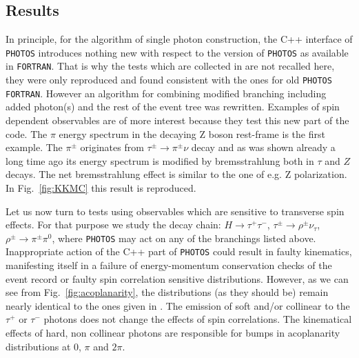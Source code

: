 \documentclass[]{Photos_interface_design}
\begin{document}
\subsection{Results}
\label{sec:results}
In principle, for the algorithm of single photon construction, the C++ interface of
{\tt PHOTOS} introduces nothing new with respect to the 
version of {\tt PHOTOS} as available in {\tt FORTRAN}.
That is why the  tests which are collected in \cite{Photos_tests} are not
recalled here, they were only reproduced and found consistent with the ones for
old {\tt PHOTOS FORTRAN}.
However an algorithm for combining modified branching including added 
photon(s) and the rest of the event tree was rewritten.
Examples of spin dependent observables are of more interest because they test this new part of the code.
The $\pi$ energy spectrum in the decaying
Z boson rest-frame is the first example. 
The $\pi^\pm$ originates from $\tau^\pm \to \pi^\pm \nu $ decay and 
as was shown already a long time ago \cite{Boillot:1988re} its energy spectrum is modified by bremsstrahlung both in $\tau$ and $Z$ decays. The net
bremsstrahlung  effect is similar to the one of e.g. Z polarization. In Fig.~\ref{fig:KKMC} this result is reproduced.

Let us now turn to tests using observables which are sensitive to
transverse spin effects.  For that purpose we study the decay chain:
$H\to \tau^+\tau^-$, $\tau^\pm \to \rho^\pm \nu_\tau$, $\rho^\pm \to
\pi^\pm \pi^0$, where {\tt PHOTOS} may act on any of the branchings
listed above. Inappropriate action of the C++ part of {\tt PHOTOS}
could result in faulty kinematics, manifesting itself in a failure of
energy-momentum conservation checks of the event record or faulty spin
correlation sensitive distributions. However, as we can see from Fig.~\ref{fig:acoplanarity},
 the distributions (as they should be) remain nearly identical to the ones given in
\cite{tauolaC++,Davidson:2010rw}. The emission of soft and/or
collinear to the $\tau^+$ or $\tau^-$  photons does not change the
effects of spin correlations. The kinematical effects of hard,
non collinear  photons are responsible for bumps in 
acoplanarity distributions at $0$, $\pi$ and $2\pi$.
\end{document}
